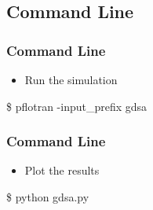 \documentclass{beamer}
\begin{document}
\subsection{Command Line}
\begin{frame}[fragile]\frametitle{Command Line}

\begin{itemize}
  \item Run the simulation
\end{itemize}
\begin{semiverbatim}
\$ pflotran -input_prefix gdsa
\end{semiverbatim}

\end{frame}

\begin{frame}[fragile]\frametitle{Command Line}

\begin{itemize}
  \item Plot the results
\end{itemize}

\begin{semiverbatim}
\$ python gdsa.py
\end{semiverbatim}

\end{frame}

\end{document}
